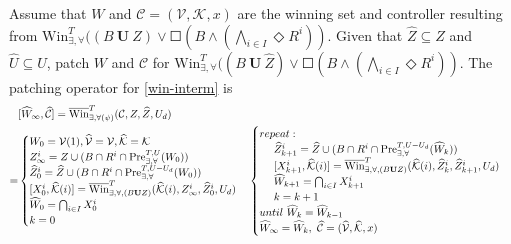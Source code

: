 Assume that $ W $ and $ \mathcal{C}=(\mathcal{V},\mathcal{K},x) $ are the winning set and controller resulting from $\text{Win}_{\exists,\forall}^{T}((B\mathbf{\ U\ }Z)\vee \Square(B\wedge (\bigwedge_{i\in I} \Diamond R^i)) $. Given that $ \widehat{Z}\subseteq Z $ and $ \widehat{U}\subseteq U $, patch $ W $ and $ \mathcal{C} $ for $\text{Win}_{\exists,\forall}^{T}((B\mathbf{\ U\ }\widehat{Z})\vee \Square(B\wedge (\bigwedge_{i\in I} \Diamond R^i)) $. The patching operator for \eqref{win-interm} is 
{\small\begin{align}
&[\widehat{W}_{\infty},\widehat{\mathcal{C}}]=\overline{\text{Win}}^{T}_{\exists,\forall (\psi)} (\mathcal{C},Z,\widehat{Z},U_d)\nonumber\\
=&\begin{cases}
W_0 = \mathcal{V}(1),\widehat{\mathcal{V}}=\mathcal{V},\widehat{\mathcal{K}}=\mathcal{K}\\
Z_{\infty}^i = Z\cup (B\cap R^i\cap \text{Pre}_{\exists, \forall}^{T,U}(W_0))\\
\widehat{Z}_{0}^i = \widehat{Z}\cup (B\cap R^i\cap \text{Pre}_{\exists, \forall}^{T,U-U_d}(W_0))\\
[X^i_0,\widehat{\mathcal{K}}(i)] = \overline{\text{Win}}^{T}_{\exists,\forall, (B\mathbf{U}Z)}(\widehat{\mathcal{K}}(i),Z_\infty^i,\widehat{Z}_0^i, U_d)\\
\widehat{W}_{0} = \bigcap_{i\in I} X^i_0\\
{\color{black} k=0}
\end{cases}
\begin{cases}
{\color{black} repeat:}\\
\ \ \ \ \widehat{Z}_{k+1}^i = \widehat{Z} \cup (B\cap R^i\cap \text{Pre}_{\exists, \forall}^{T,U-U_d}(\widehat{W}_k))\\
\ \ \ \ [X^i_{k+1},\widehat{\mathcal{K}}(i)]=\overline{\text{Win}}^{T}_{\exists,\forall,(B\mathbf{U}Z)}(\widehat{\mathcal{K}}(i),\widehat{Z}_k^i,\widehat{Z}_{k+1}^i, U_d)\\
\ \ \ \ \widehat{W}_{k+1} = \bigcap_{i\in I} X^i_{k+1}\\
\ \ \ \ {\color{black} k = k+1}\\
{\color{black} until \ \widehat{W}_{k}=\widehat{W}_{k-1}}\\
\widehat{W}_\infty = \widehat{W}_k,\ \widehat{\mathcal{C}}=(\widehat{\mathcal{V}},\widehat{\mathcal{K}},x)
\end{cases}\label{patch-interm}
\end{align}
}
